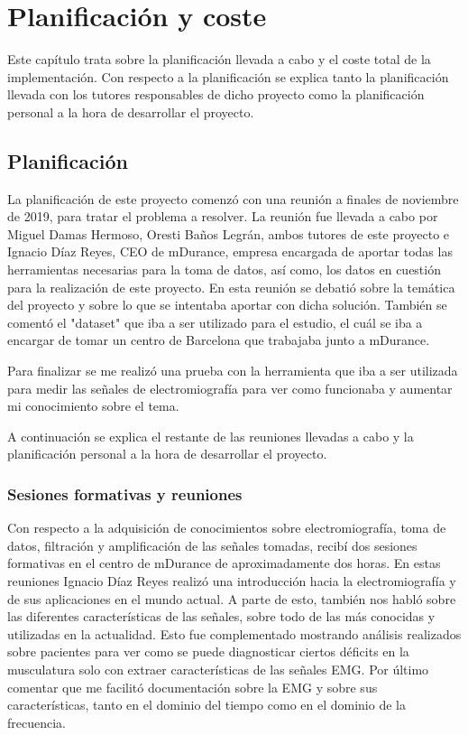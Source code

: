 \chapter{Planificación y coste}
Este capítulo trata sobre la planificación llevada a cabo y el coste total de la implementación. Con respecto a la planificación se explica tanto la planificación llevada con los tutores responsables de dicho proyecto como la planificación personal a la hora de desarrollar el proyecto.

\section{Planificación}
La planificación de este proyecto comenzó con una reunión a finales de noviembre de 2019, para tratar el problema a resolver. La reunión fue llevada a cabo por Miguel Damas Hermoso, Oresti Baños Legrán, ambos tutores de este proyecto e Ignacio Díaz Reyes, CEO de mDurance, empresa encargada de aportar todas las herramientas necesarias para la toma de datos, así como, los datos en cuestión para la realización de este proyecto.
En esta reunión se debatió sobre la temática del proyecto y sobre lo que se intentaba aportar con dicha solución. También se comentó el "dataset" que iba a ser utilizado para el estudio, el cuál se iba a encargar de tomar un centro de Barcelona que trabajaba junto a mDurance.

Para finalizar se me realizó una prueba con la herramienta que iba a ser utilizada para medir las señales de electromiografía para ver como funcionaba y aumentar mi conocimiento sobre el tema.

A continuación se explica el restante de las reuniones llevadas a cabo y la planificación personal a la hora de desarrollar el proyecto.

\subsection{Sesiones formativas y reuniones}

Con respecto a la adquisición de conocimientos sobre electromiografía, toma de datos, filtración y amplificación de las señales tomadas, recibí dos sesiones formativas en el centro de mDurance de aproximadamente dos horas. En estas reuniones Ignacio Díaz Reyes realizó una introducción hacia la electromiografía y de sus aplicaciones en el mundo actual. A parte de esto, también nos habló sobre las diferentes características de las señales, sobre todo de las más conocidas y utilizadas en la actualidad.
Esto fue complementado mostrando análisis realizados sobre pacientes para ver como se puede diagnosticar ciertos déficits en la musculatura solo con extraer características de las señales EMG. Por último comentar que me facilitó documentación sobre la EMG y sobre sus características, tanto en el dominio del tiempo como en el dominio de la frecuencia.

